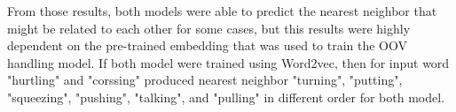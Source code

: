         From those results, both models were able to predict the
        nearest neighbor that might be related to each other for some
        cases, but this results were highly dependent on the pre-trained
        embedding that was used to train the OOV handling model. If both model
        were trained using Word2vec, then for input word "hurtling"
        and "corssing" produced nearest neighbor "turning", "putting",
        "squeezing", "pushing", "talking", and "pulling" in different
        order for both model.
        



